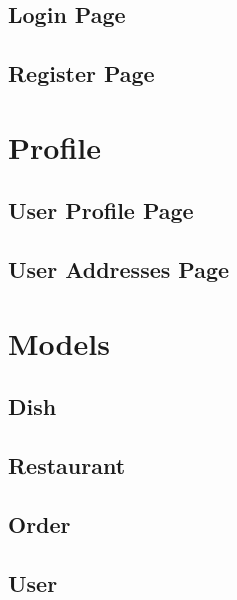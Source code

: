 \subsection{Login Page}

\subsection{Register Page}

\section{Profile}
\subsection{User Profile Page}

\subsection{User Addresses Page}

\section{Models}
\subsection{Dish}

\subsection{Restaurant}

\subsection{Order}

\subsection{User}

